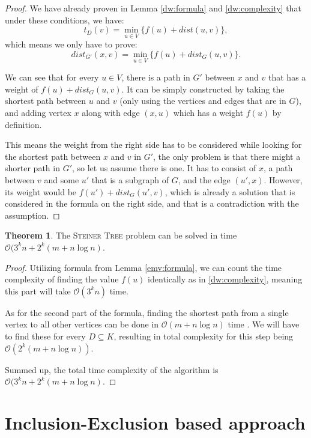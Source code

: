 \documentclass[thesis=M,english,hidelinks]{FITthesis}[2012/10/20]
\theoremstyle{definition}
\newtheorem{theorem}{Theorem}
\begin{document}
\begin{proof}
    We have already proven in Lemma \ref{dw:formula} and \autoref{dw:complexity} that under these conditions, we have:
    $$
    t_D(v) = \min_{u \in V} \{ f(u) + dist(u, v) \},
    $$
    which means we only have to prove:
    $$
    dist_{G'}(x, v) = \min_{u \in V} \{ f(u) + dist_G(u, v) \}.
    $$

    We can see that for every $u \in V$, there is a path in $G'$ between $x$ and $v$ that has a weight of $f(u) +
    dist_G(u, v)$. It can be simply constructed by taking the shortest path between $u$ and $v$ (only using the vertices
    and edges that are in $G$), and adding vertex $x$ along with edge $(x, u)$ which has a weight $f(u)$ by
    definition.

    This means the weight from the right side has to be considered while looking for the shortest path between $x$ and
    $v$ in $G'$, the only problem is that there might a shorter path in $G'$, so let us assume there is one. It has to
    consist of $x$, a path between $v$ and some $u'$ that is a subgraph of $G$, and the edge $(u', x)$. However, its
    weight would be $f(u') + dist_{G}(u', v)$, which is already a solution that is considered in the formula on the
    right side, and that is a contradiction with the assumption.
\end{proof}

\begin{theorem}
    \label{emv:complexity}
    The \textsc{Steiner Tree} problem can be solved in time $\mathcal{O}(3^k n + 2^k (m + n \log n)$.
\end{theorem}

\begin{proof}
    Utilizing formula from Lemma \ref{emv:formula}, we can count the time complexity of finding the value $f(u)$
    identically as in \autoref{dw:complexity}, meaning this part will take $\mathcal{O}(3^k n)$ time.

    As for the second part of the formula, finding the shortest path from a single vertex to all other vertices can be
    done in $\mathcal{O}(m + n \log n)$ time \cite{Dijkstra1959}. We will have to find these for every $D \subseteq K$,
    resulting in total complexity for this step being $\mathcal{O}(2^k (m + n \log n))$.

    Summed up, the total time complexity of the algorithm is $\mathcal{O}(3^k n + 2^k (m + n \log n)$.
\end{proof}

\section{Inclusion-Exclusion based approach}
\label{sec:inex}
\end{document}
